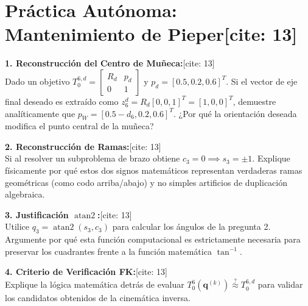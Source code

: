 \documentclass[11pt, a4paper]{article}
\begin{document}
\section*{Práctica Autónoma: Mantenimiento de Pieper[cite: 13]}

\textbf{1. Reconstrucción del Centro de Muñeca:}[cite: 13] \\
Dado un objetivo $T_0^{6,d} = \begin{bmatrix} R_d & p_d \\ 0 & 1 \end{bmatrix}$ y $p_d = [0.5, 0.2, 0.6]^T$. Si el vector de eje final deseado es extraído como $z_6^d = R_d [0, 0, 1]^T = [1, 0, 0]^T$, demuestre analíticamente que $p_W = [0.5-d_6, 0.2, 0.6]^T$. ¿Por qué la orientación deseada modifica el punto central de la muñeca?
\vspace{3cm}

\textbf{2. Reconstrucción de Ramas:}[cite: 13] \\
Si al resolver un subproblema de brazo obtiene $c_3 = 0 \implies s_3 = \pm 1$. Explique físicamente por qué estos dos signos matemáticos representan verdaderas ramas geométricas (como codo arriba/abajo) y no simples artificios de duplicación algebraica.
\vspace{3cm}

\textbf{3. Justificación $\operatorname{atan2}$:}[cite: 13] \\
Utilice $q_3 = \operatorname{atan2}(s_3, c_3)$ para calcular los ángulos de la pregunta 2. Argumente por qué esta función computacional es estrictamente necesaria para preservar los cuadrantes frente a la función matemática $\tan^{-1}$.
\vspace{3cm}

\textbf{4. Criterio de Verificación FK:}[cite: 13] \\
Explique la lógica matemática detrás de evaluar $T_0^6(\mathbf{q}^{(k)}) \stackrel{?}{\approx} T_0^{6,d}$ para validar los candidatos obtenidos de la cinemática inversa.
\vspace{3cm}
\end{document}

